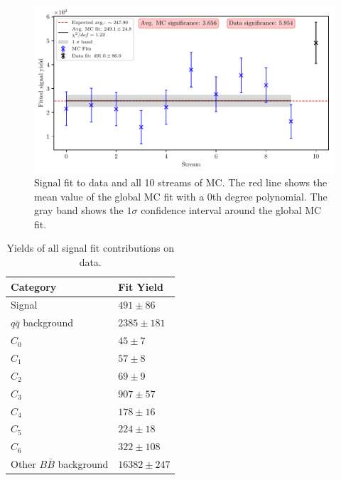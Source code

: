 \begin{figure}[H]
	\centering
	\captionsetup{width=0.8\linewidth}
	\includegraphics[width=\linewidth]{fig/sig_global}
	\caption{Signal fit to data and all 10 streams of MC. The red line shows the mean value of the global MC fit with a 0th degree polynomial. The gray band shows the $1\sigma$ confidence interval around the global MC fit.}
	\label{fig:sig_all_global}
\end{figure}

\begin{table}[H]
	\centering
	\begin{tabular}{l|l}
		Category & Fit Yield \\
		\toprule
		Signal & $491 \pm 86$ \\
		$q \bar q$ background & $ 2385 \pm 181 $ \\
		$C_0$ & $ 45 \pm 7 $ \\
		$C_1$ & $ 57 \pm 8 $\\
		$C_2$ & $ 69 \pm 9 $ \\
		$C_3$ & $ 907 \pm 57 $ \\
		$C_4$ & $ 178 \pm 16 $ \\
		$C_5$ & $ 224 \pm 18 $ \\
		$C_6$ & $ 322 \pm 108 $ \\
		Other $B \bar B$ background & $ 16382 \pm 247 $ \\
		\bottomrule
	\end{tabular}
	\captionsetup{width=.8\linewidth}
	\caption{Yields of all signal fit contributions on data.}
	\label{tab:sig_yields}
\end{table}


